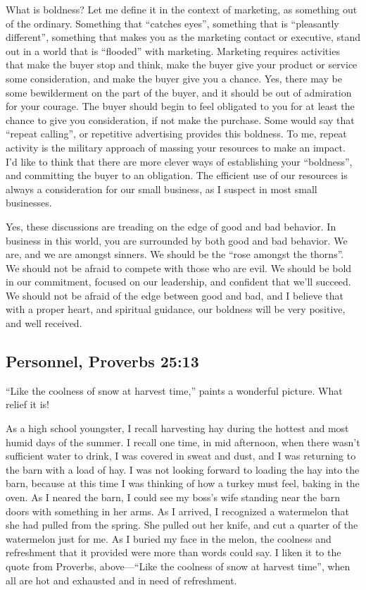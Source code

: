 \documentclass[12pt]{memoir}
\begin{document}
What is boldness? Let me define it in the context of marketing, as
something out of the ordinary. Something that ``catches eyes'',
something that is ``pleasantly different'', something that makes
you as the marketing contact or executive, stand out in a world that
is ``flooded'' with marketing. Marketing requires activities that
make the buyer stop and think, make the buyer give your product or
service some consideration, and make the buyer give you a chance.
Yes, there may be some bewilderment on the part of the buyer, and
it should be out of admiration for your courage. The buyer should
begin to feel obligated to you for at least the chance to give you
consideration, if not make the purchase. Some would say that ``repeat
calling'', or repetitive advertising provides this boldness. To me,
repeat activity is the military approach of massing your resources
to make an impact. I'd like to think that there are more clever ways
of establishing your ``boldness'', and committing the buyer to an
obligation. The efficient use of our resources is always a consideration
for our small business, as I suspect in most small businesses.

Yes, these discussions are treading on the edge of good and bad behavior.
In business in this world, you are surrounded by both good and bad
behavior. We are, and we are amongst sinners. We should be the ``rose
amongst the thorns''. We should not be afraid to compete with those
who are evil. We should be bold in our commitment, focused on
our leadership, and confident that we'll succeed. We should not be
afraid of the edge between good and bad, and I believe that
with a proper heart, and spiritual guidance, our boldness will
be very positive, and well received.

\subsection{Personnel, Proverbs 25:13}

``Like the coolness of snow at harvest time,'' paints a wonderful
picture. What relief it is!

As a high school youngster, I recall harvesting hay during the hottest
and most humid days of the summer. I recall one time, in mid afternoon,
when there wasn't sufficient water to drink, I was covered in sweat
and dust, and I was returning to the barn with a load of hay. I was
not looking forward to loading the hay into the barn, because at this
time I was thinking of how a turkey must feel, baking in the oven.
As I neared the barn, I could see my boss's wife standing near the
barn doors with something in her arms. As I arrived, I recognized
a watermelon that she had pulled from the spring. She pulled out her
knife, and cut a quarter of the watermelon just for me. As I buried
my face in the melon, the coolness and refreshment that it provided
were more than words could say. I liken it to the quote from Proverbs,
above---``Like the coolness of snow at harvest time'', when all
are hot and exhausted and in need of refreshment.
\end{document}

